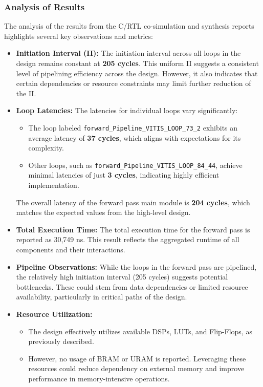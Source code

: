 \documentclass{article}
\begin{document}
\subsubsection{Analysis of Results}

The analysis of the results from the C/RTL co-simulation and synthesis reports highlights several key observations and metrics:

\begin{itemize}
    \item \textbf{Initiation Interval (II):} The initiation interval across all loops in the design remains constant at \textbf{205 cycles}. This uniform II suggests a consistent level of pipelining efficiency across the design. However, it also indicates that certain dependencies or resource constraints may limit further reduction of the II.

    \item \textbf{Loop Latencies:} The latencies for individual loops vary significantly:
    \begin{itemize}
        \item The loop labeled \texttt{forward\_Pipeline\_VITIS\_LOOP\_73\_2} exhibits an average latency of \textbf{37 cycles}, which aligns with expectations for its complexity.
        \item Other loops, such as \texttt{forward\_Pipeline\_VITIS\_LOOP\_84\_44}, achieve minimal latencies of just \textbf{3 cycles}, indicating highly efficient implementation.
    \end{itemize}
    The overall latency of the forward pass main module is \textbf{204 cycles}, which matches the expected values from the high-level design.

    \item \textbf{Total Execution Time:} The total execution time for the forward pass is reported as 30,749 ns. This result reflects the aggregated runtime of all components and their interactions.

    \item \textbf{Pipeline Observations:} While the loops in the forward pass are pipelined, the relatively high initiation interval (205 cycles) suggests potential bottlenecks. These could stem from data dependencies or limited resource availability, particularly in critical paths of the design.

    \item \textbf{Resource Utilization:} 
    \begin{itemize}
        \item The design effectively utilizes available DSPs, LUTs, and Flip-Flops, as previously described.
        \item However, no usage of BRAM or URAM is reported. Leveraging these resources could reduce dependency on external memory and improve performance in memory-intensive operations.
    \end{itemize}
\end{itemize}
\end{document}
